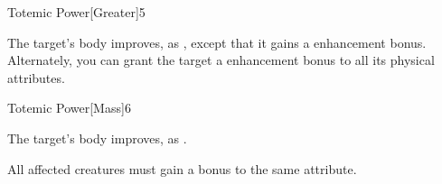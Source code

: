 \begin{spellsection}{Totemic Power}[Greater]{5}
\begin{spellheader}
    \begin{spelltargetinginfo}
    \end{spelltargetinginfo}
\end{spellheader}
\begin{spellcontent}
    \begin{spelleffects}
        \spelleffect The target's body improves, as , except that it gains a  enhancement bonus. Alternately, you can grant the target a  enhancement bonus to all its physical attributes.
        \spelldur \durshort
    \end{spelleffects}
\end{spellcontent}
\begin{spellfooter}
\end{spellfooter}
\end{spellsection}

\begin{spellsection}{Totemic Power}[Mass]{6}
\begin{spellheader}
    \begin{spelltargetinginfo}
    \end{spelltargetinginfo}
\end{spellheader}
\begin{spellcontent}
    \begin{spelleffects}
        \spelleffect The target's body improves, as . 
    \end{spelleffects}
\end{spellcontent}
\begin{spellfooter}
    \spellnotes All affected creatures must gain a bonus to the same attribute.
\end{spellfooter}
\end{spellsection}

